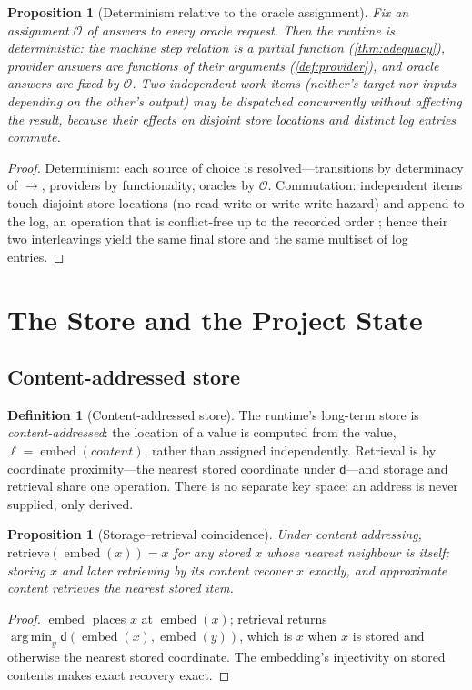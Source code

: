 \documentclass[11pt,a4paper]{article}
\theoremstyle{plain}
\newtheorem{proposition}[theorem]{Proposition}
\theoremstyle{definition}
\newtheorem{definition}[theorem]{Definition}
\theoremstyle{remark}
\DeclareMathOperator{\emb}{embed}
\DeclareMathOperator*{\argmin}{arg\,min}
\newcommand{\stepm}{\longrightarrow}       %
\newcommand{\dist}{\mathsf{d}}
\begin{document}
\begin{proposition}[Determinism relative to the oracle assignment]
\label{prop:determinism}
Fix an assignment $\mathcal{O}$ of answers to every oracle request. Then the
runtime is deterministic: the machine step relation is a partial function
(\cref{thm:adequacy}), provider answers are functions of their arguments
(\cref{def:provider}), and oracle answers are fixed by $\mathcal{O}$. Two
independent work items (neither's target nor inputs depending on the other's
output) may be dispatched concurrently without affecting the result, because
their effects on disjoint store locations and distinct log entries commute.
\end{proposition}
\begin{proof}
Determinism: each source of choice is resolved---transitions by determinacy of
$\stepm$, providers by functionality, oracles by $\mathcal{O}$. Commutation:
independent items touch disjoint store locations (no read-write or write-write
hazard) and append to the log, an operation that is conflict-free up to the
recorded order \citep{lamport1978}; hence their two interleavings yield the same
final store and the same multiset of log entries.
\end{proof}

\section{The Store and the Project State}
\label{sec:store}

\subsection{Content-addressed store}

\begin{definition}[Content-addressed store]
\label{def:castore}
The runtime's long-term store is \emph{content-addressed}: the location of a
value is computed from the value, $\ell=\emb(\mathit{content})$, rather than
assigned independently. Retrieval is by coordinate proximity---the nearest
stored coordinate under $\dist$---and storage and retrieval share one operation.
There is no separate key space: an address is never supplied, only derived.
\end{definition}

\begin{proposition}[Storage--retrieval coincidence]
\label{prop:storeretrieve}
Under content addressing, $\mathrm{retrieve}(\emb(x))=x$ for any stored $x$
whose nearest neighbour is itself; storing $x$ and later retrieving by its
content recover $x$ exactly, and approximate content retrieves the nearest
stored item.
\end{proposition}
\begin{proof}
$\emb$ places $x$ at $\emb(x)$; retrieval returns $\argmin_{y}\dist(\emb(x),
\emb(y))$, which is $x$ when $x$ is stored and otherwise the nearest stored
coordinate. The embedding's injectivity on stored contents makes exact recovery
exact.
\end{proof}
\end{document}
